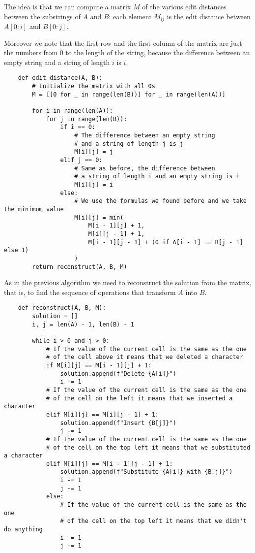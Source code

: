 \documentclass[12pt]{extarticle}
\begin{document}
The idea is that we can compute a matrix $M$ of the various edit distances between the substrings of $A$ and $B$: each element $M_{ij}$ is the edit distance between $A[0:i]$ and $B[0:j]$.

Moreover we note that the first row and the first column of the matrix are just the numbers from 0 to the length of the string, because the difference between an empty string and a string of length $i$ is $i$.

\begin{verbatim}
    def edit_distance(A, B):
        # Initialize the matrix with all 0s
        M = [[0 for _ in range(len(B))] for _ in range(len(A))]

        for i in range(len(A)):
            for j in range(len(B)):
                if i == 0:
                    # The difference between an empty string
                    # and a string of length j is j
                    M[i][j] = j
                elif j == 0:
                    # Same as before, the difference between
                    # a string of length i and an empty string is i
                    M[i][j] = i
                else:
                    # We use the formulas we found before and we take the minimum value
                    M[i][j] = min(
                        M[i - 1][j] + 1,
                        M[i][j - 1] + 1,
                        M[i - 1][j - 1] + (0 if A[i - 1] == B[j - 1] else 1)
                    )
        return reconstruct(A, B, M)
\end{verbatim}

As in the previous algorithm we need to reconstruct the solution from the matrix, that is, to find the sequence of operations that transform $A$ into $B$.

\begin{verbatim}
    def reconstruct(A, B, M):
        solution = []
        i, j = len(A) - 1, len(B) - 1

        while i > 0 and j > 0:
            # If the value of the current cell is the same as the one
            # of the cell above it means that we deleted a character
            if M[i][j] == M[i - 1][j] + 1:
                solution.append(f"Delete {A[i]}")
                i -= 1
            # If the value of the current cell is the same as the one
            # of the cell on the left it means that we inserted a character
            elif M[i][j] == M[i][j - 1] + 1:
                solution.append(f"Insert {B[j]}")
                j -= 1
            # If the value of the current cell is the same as the one
            # of the cell on the top left it means that we substituted a character
            elif M[i][j] == M[i - 1][j - 1] + 1:
                solution.append(f"Substitute {A[i]} with {B[j]}")
                i -= 1
                j -= 1
            else:
                # If the value of the current cell is the same as the one
                # of the cell on the top left it means that we didn't do anything
                i -= 1
                j -= 1

\end{verbatim}
\end{document}
